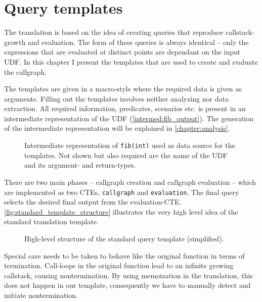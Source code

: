 \chapter{Query templates}\label{template}



The translation is based on the idea of creating queries that reproduce callstack-growth and evaluation. The form of these queries is always identical -- only the expressions that are evaluated at distinct points are dependant on the input UDF. In this chapter I present the templates that are used to create and evaluate the callgraph.

The templates are given in a macro-style where the required data is given as arguments. Filling out the templates involves neither analyzing nor data extraction. All required information, predicates, scenarios etc. is present in an intermediate representation of the UDF (\autoref{intermed:fib_output}). The generation of the intermediate representation will be explained in \autoref{chapter:analysis}.

\begin{figure}[h!]
    \centering\small
    
    \caption{Intermediate representation of \texttt{fib(int)} used as data source for the templates. Not shown but also required are the name of the UDF and its argument- and return-types.}
    \label{intermed:fib_output}
\end{figure}



There are two main phases -- callgraph creation and callgraph evaluation -- which are implemented as two CTEs, \texttt{callgraph} and \texttt{evaluation}. The final query selects the desired final output from the evaluation-CTE. \autoref{fig:standard_template_structure} illustrates the very high level idea of the standard translation template.

\begin{figure}[h!]
    \centering
    \caption{High-level structure of the standard query template (simplified).}
    \label{fig:standard_template_structure}
\end{figure}

Special care needs to be taken to behave like the original function in terms of termination. Call-loops in the original function lead to an infinite growing callstack, causing nontermination. By using memoization in the translation, this does not happen in our template, consequently we have to manually detect and initiate nontermination.

